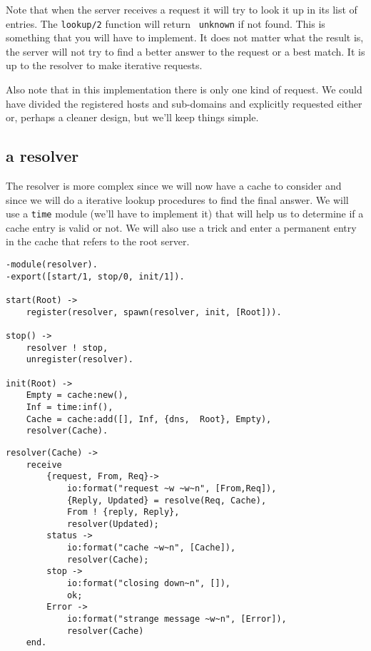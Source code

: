 \documentclass[a4paper, 11pt]{article}
\begin{document}
Note that when the server receives a request it will try to look it up
in its list of entries. The {\tt lookup/2} function will return {\tt
unknown} if not found. This is something that you will have to
implement. It does not matter what the result is, the server will not
try to find a better answer to the request or a best match. It is up
to the resolver to make iterative requests.

Also note that in this implementation there is only one kind of
request. We could have divided the registered hosts and sub-domains
and explicitly requested either or, perhaps a cleaner design, but
we'll keep things simple.

\subsection{a resolver}

The resolver is more complex since we will now have a cache to
consider and since we will do a iterative lookup procedures to find
the final answer. We will use a {\tt time} module (we'll have to
implement it) that will help us to determine if a cache entry is valid
or not. We will also use a trick and enter a permanent entry in the
cache that refers to the root server.

\begin{verbatim}
-module(resolver).
-export([start/1, stop/0, init/1]).

start(Root) ->    
    register(resolver, spawn(resolver, init, [Root])).

stop() ->
    resolver ! stop,
    unregister(resolver).

init(Root) ->
    Empty = cache:new(),
    Inf = time:inf(),
    Cache = cache:add([], Inf, {dns,  Root}, Empty),
    resolver(Cache).
\end{verbatim}


\begin{verbatim}
resolver(Cache) ->
    receive 
        {request, From, Req}->
            io:format("request ~w ~w~n", [From,Req]),
            {Reply, Updated} = resolve(Req, Cache),
            From ! {reply, Reply},
            resolver(Updated);
        status ->
            io:format("cache ~w~n", [Cache]),            
            resolver(Cache);
        stop ->
            io:format("closing down~n", []),            
            ok;
        Error ->
            io:format("strange message ~w~n", [Error]),
            resolver(Cache)
    end.
\end{verbatim}
\end{document}
